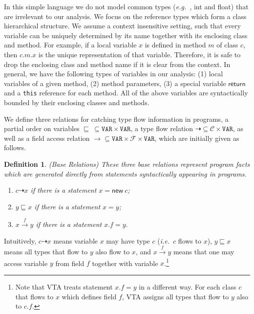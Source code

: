 \documentclass{fac}
\newcommand\eg{\textit{e.g.\ }}
\newcommand\ie{\textit{i.e.\ }}
\newtheorem{Definition}{Definition}
\newcommand{\keyword}[1]{\mathsf{#1}}
\newcommand{\kwnew}[0]{\keyword{new}}
\newcommand\Var{\mathtt{VAR}}
\newcommand{\Class}{\mathcal{C}}
\newcommand{\Field}{\mathcal{F}}
\newcommand{\less}{\sqsubseteq}
\newcommand{\tflow}{\dashrightarrow}
\newcommand{\hflow}{\longrightarrow}
\newcommand{\lhflow}[1]{\stackrel{#1}{\hflow}}
\begin{document}
In this simple language we do not model common types (\eg, int and float) that are irrelevant to our analysis. We focus on the reference types which form a class hierarchical structure. We assume a context insensitive setting, such that every variable can be uniquely determined by its name together with its enclosing class and method.
For example, if a local variable $x$ is defined in method $m$ of class $c$, then $c.m.x$ is the unique representation of that variable. Therefore, it is safe to drop the enclosing class and method name if it is clear from the context.
In general, we have the following types of variables in our analysis: (1) local variables of a given method, (2) method parameters, (3) a special variable $\keyword{return}$ and a \texttt{this} reference for each method. All of the above variables are syntactically bounded by their enclosing classes and methods. %

We define three relations for catching type flow information in programs, a partial order on variables $\less\ \subseteq\Var\times\Var$, a type flow relation
$\tflow\subseteq\Class\times\Var$, as well as a field access relation $\hflow\subseteq\Var\times\Field\times\Var$,
which are initially given as follows.

\begin{Definition}\label{def:base} (Base Relations)
These three base relations represent program facts which are generated directly %
from statements syntactically appearing in programs.
\begin{enumerate}
  \item $c\tflow x$ if there is a statement $x = \kwnew\ c$;
  \item $y\less x$ if there is a statement $x = y $;
  \item $x\lhflow{f}y$ if there is a statement $x.f = y$.
\end{enumerate}
\end{Definition}

Intuitively, $c\tflow x$ means variable $x$ may have type $c$ (\ie $c$ flows to $x$), $y\less x$ means all types that flow to $y$ also flow to $x$, and $x\lhflow{f}y$ means that one may access variable $y$ from field $f$ together with variable $x$.\footnote{Note that VTA treats statement $x.f = y$ in a different way. For each class $c$ that flows to $x$ which defines field $f$, VTA assigns all types that flow to $y$ also to $c.f$.}
\end{document}
